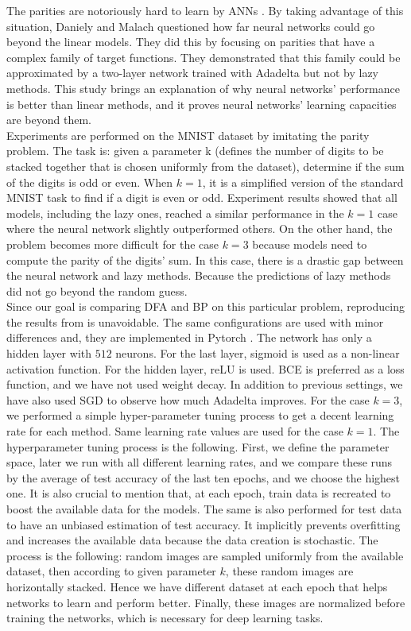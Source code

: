\documentclass[a4paper, nobind]{templates/ociamthesis}
\begin{document}
The parities are notoriously hard to learn by ANNs \cite{DBLP:journals/corr/abs-1807-06399}. By taking advantage of this situation, Daniely and Malach \cite{DBLP:journals/corr/abs-2002-07400} questioned how far neural networks could go beyond the linear models. They did this by focusing on parities that have a complex family of target functions. They demonstrated that this family could be approximated by a two-layer network trained with Adadelta but not by lazy methods. This study brings an explanation of why neural networks' performance is better than linear methods, and it proves neural networks' learning capacities are beyond them.\\
Experiments are performed on the MNIST dataset by imitating the parity problem. The task is: given a parameter k (defines the number of digits to be stacked together that is chosen uniformly from the dataset), determine if the sum of the digits is odd or even. When \(k=1\), it is a simplified version of the standard MNIST task to find if a digit is even or odd. Experiment results showed that all models, including the lazy ones, reached a similar performance in the \(k=1\) case where the neural network slightly outperformed others. On the other hand, the problem becomes more difficult for the case \(k=3\) because models need to compute the parity of the digits' sum. In this case, there is a drastic gap between the neural network and lazy methods. Because the predictions of lazy methods did not go beyond the random guess.\\
Since our goal is comparing DFA and BP on this particular problem, reproducing the results from \cite{DBLP:journals/corr/abs-2002-07400} is unavoidable. The same configurations are used with minor differences and, they are implemented in Pytorch \cite{NEURIPS2019_9015}. The network has only a hidden layer with \(512\) neurons. For the last layer, sigmoid is used as a non-linear activation function. For the hidden layer, reLU is used. BCE is preferred as a loss function, and we have not used weight decay. In addition to previous settings, we have also used SGD to observe how much Adadelta improves. For the case \(k=3\), we performed a simple hyper-parameter tuning process to get a decent learning rate for each method. Same learning rate values are used for the case \(k=1\). The hyperparameter tuning process is the following. First, we define the parameter space, later we run with all different learning rates, and we compare these runs by the average of test accuracy of the last ten epochs, and we choose the highest one. It is also crucial to mention that, at each epoch, train data is recreated to boost the available data for the models. The same is also performed for test data to have an unbiased estimation of test accuracy. It implicitly prevents overfitting and increases the available data because the data creation is stochastic. The process is the following: random images are sampled uniformly from the available dataset, then according to given parameter \(k\), these random images are horizontally stacked. Hence we have different dataset at each epoch that helps networks to learn and perform better. Finally, these images are normalized before training the networks, which is necessary for deep learning tasks.
\end{document}
